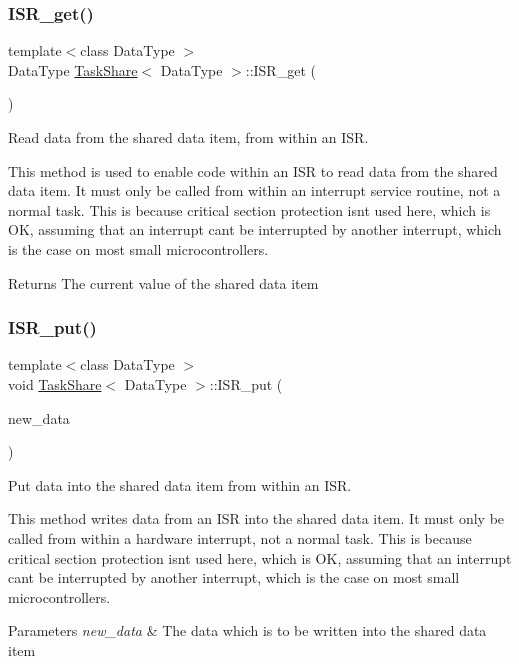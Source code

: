 \subsubsection{\texorpdfstring{I\+S\+R\+\_\+get()}{ISR\_get()}}
{\footnotesize\ttfamily template$<$class Data\+Type $>$ \\
Data\+Type \mbox{\hyperlink{class_task_share}{Task\+Share}}$<$ Data\+Type $>$\+::I\+S\+R\+\_\+get (\begin{DoxyParamCaption}\item[{void}]{ }\end{DoxyParamCaption})}



Read data from the shared data item, from within an I\+SR. 

This method is used to enable code within an I\+SR to read data from the shared data item. It must only be called from within an interrupt service routine, not a normal task. This is because critical section protection isn\textquotesingle{}t used here, which is OK, assuming that an interrupt can\textquotesingle{}t be interrupted by another interrupt, which is the case on most small microcontrollers. \begin{DoxyReturn}{Returns}
The current value of the shared data item 
\end{DoxyReturn}
\mbox{\label{class_task_share_a78de768fa4760c6e8f74c7795ff164c7}} 
\subsubsection{\texorpdfstring{I\+S\+R\+\_\+put()}{ISR\_put()}}
{\footnotesize\ttfamily template$<$class Data\+Type $>$ \\
void \mbox{\hyperlink{class_task_share}{Task\+Share}}$<$ Data\+Type $>$\+::I\+S\+R\+\_\+put (\begin{DoxyParamCaption}\item[{Data\+Type}]{new\+\_\+data }\end{DoxyParamCaption})}



Put data into the shared data item from within an I\+SR. 

This method writes data from an I\+SR into the shared data item. It must only be called from within a hardware interrupt, not a normal task. This is because critical section protection isn\textquotesingle{}t used here, which is OK, assuming that an interrupt can\textquotesingle{}t be interrupted by another interrupt, which is the case on most small microcontrollers. 
\begin{DoxyParams}{Parameters}
{\em new\+\_\+data} & The data which is to be written into the shared data item \\
\hline
\end{DoxyParams}
\mbox{\label{class_task_share_a8c3b841652c2cde1bfb279aa5bfcc61f}} 

